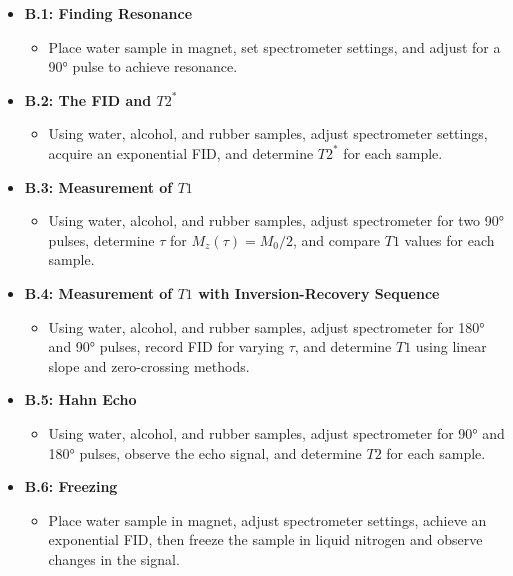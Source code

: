 \documentclass{article}
\begin{document}
\begin{itemize}
\item \textbf{B.1: Finding Resonance}
  \begin{itemize}
  \item Place water sample in magnet, set spectrometer settings, and adjust for a 90° pulse to achieve resonance.
  \end{itemize}

\item \textbf{B.2: The FID and \( T2^* \)}
  \begin{itemize}
  \item Using water, alcohol, and rubber samples, adjust spectrometer settings, acquire an exponential FID, and determine \( T2^* \) for each sample.
  \end{itemize}

\item \textbf{B.3: Measurement of \( T1 \)}
  \begin{itemize}
  \item Using water, alcohol, and rubber samples, adjust spectrometer for two 90° pulses, determine \( \tau \) for \( M_z(\tau) = M_0/2 \), and compare \( T1 \) values for each sample.
  \end{itemize}

\item \textbf{B.4: Measurement of \( T1 \) with Inversion-Recovery Sequence}
  \begin{itemize}
  \item Using water, alcohol, and rubber samples, adjust spectrometer for 180° and 90° pulses, record FID for varying \( \tau \), and determine \( T1 \) using linear slope and zero-crossing methods.
  \end{itemize}

\item \textbf{B.5: Hahn Echo}
  \begin{itemize}
  \item Using water, alcohol, and rubber samples, adjust spectrometer for 90° and 180° pulses, observe the echo signal, and determine \( T2 \) for each sample.
  \end{itemize}

\item \textbf{B.6: Freezing}
  \begin{itemize}
  \item Place water sample in magnet, adjust spectrometer settings, achieve an exponential FID, then freeze the sample in liquid nitrogen and observe changes in the signal.
  \end{itemize}
\end{itemize}
\end{document}
